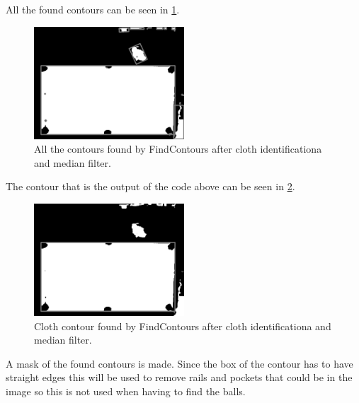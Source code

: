 All the found contours can be seen in \ref{fig:allcontours}.
\begin{figure}[H]
\begin{center}
\leavevmode
\includegraphics[width=0.5\textwidth]{images/allcontours}
\end{center}
\caption{All the contours found by FindContours after cloth identificationa and median filter.}
\label{fig:allcontours}
\end{figure}

The contour that is the output of the code above can be seen in \ref{fig:clothcontour}.
\begin{figure}[H]
\begin{center}
\leavevmode
\includegraphics[width=0.5\textwidth]{images/clothcontour}
\end{center}
\caption{Cloth contour found by FindContours after cloth identificationa and median filter.}
\label{fig:clothcontour}
\end{figure}

A mask of the found contours is made. Since the box of the contour has to have straight edges this will be used to remove rails and pockets that could be in the image so this is not used when having to find the balls.

\begin{figure}[H]
\centering
{}
\end{figure}

